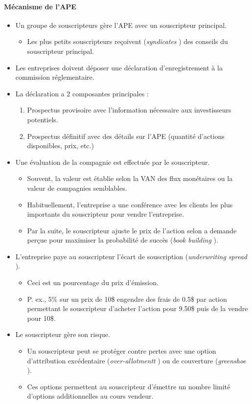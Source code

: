 \documentclass[10pt, french]{article}
\begin{document}
\begin{multicols*}{2}
\paragraph{Mécanisme de l'APE}
\begin{itemize}
	\item	Un groupe de souscripteurs gère l'APE avec un souscripteur principal.
		\begin{itemize}
		\item	Les plus petits souscripteurs reçoivent (\og \textit{syndicates} \fg{}) des conseils du souscripteur principal.
		\end{itemize}
	\item	Les entreprises doivent déposer une déclaration d'enregistrement à la commission réglementaire.
	\item	La déclaration a 2 composantes principales :
		\begin{enumerate}
		\item	Prospectus provisoire avec l'information nécessaire aux investisseurs potentiels.
		\item	Prospectus définitif avec des détails sur l'APE (quantité d'actions disponibles, prix, etc.)
		\end{enumerate}
	\item	Une évaluation de la compagnie est effectuée par le souscripteur.
		\begin{itemize}
		\item	Souvent, la valeur est établie selon la VAN des flux monétaires ou la valeur de compagnies semblables.
		\item	Habituellement, l'entreprise a une conférence avec les clients les plus importants du souscripteur pour vendre l'entreprise.
		\item	Par la suite, le souscripteur ajuste le prix de l'action selon a demande perçue pour maximiser la probabilité de succès (\og \textit{book building} \fg{}).
		\end{itemize}
	\item	L'entreprise paye au souscripteur l'écart de souscription (\og \textit{underwriting spread} \fg{}).
		\begin{itemize}
		\item	Ceci est un pourcentage du prix d'émission.
		\item	P. ex., 5\% sur un prix de 10\$ engendre des frais de 0.5\$ par action permettant le souscripteur d'acheter l'action pour 9.50\$ puis de la vendre pour 10\$.
		\end{itemize}
	\item	Le souscripteur gère son risque.
		\begin{itemize}
		\item	Un souscripteur peut se protéger contre pertes avec une option d'attribution excédentaire (\og \textit{over-allotmentt} \fg{}) ou de couverture (\og \textit{greenshoe} \fg{}).
		\item	Ces options permettent au souscripteur d'émettre un nombre limité d'options additionnelles au cours vendeur.
		\end{itemize}
\end{itemize}



\end{multicols*}
\end{document}
